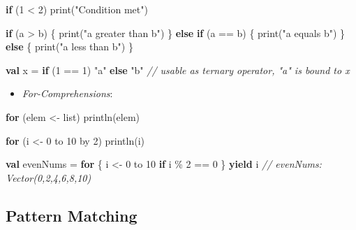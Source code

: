 \documentclass[]{article}
\newenvironment{Shaded}{}{}
\newcommand{\CommentTok}[1]{\textcolor[rgb]{0.38,0.63,0.69}{\textit{#1}}}
\newcommand{\DecValTok}[1]{\textcolor[rgb]{0.25,0.63,0.44}{#1}}
\newcommand{\FunctionTok}[1]{\textcolor[rgb]{0.02,0.16,0.49}{#1}}
\newcommand{\KeywordTok}[1]{\textcolor[rgb]{0.00,0.44,0.13}{\textbf{#1}}}
\newcommand{\NormalTok}[1]{#1}
\newcommand{\StringTok}[1]{\textcolor[rgb]{0.25,0.44,0.63}{#1}}
\providecommand{\tightlist}{%
  \setlength{\itemsep}{0pt}\setlength{\parskip}{0pt}}
\begin{document}
\begin{Shaded}
\begin{Highlighting}[]
\KeywordTok{if}\NormalTok{ (}\DecValTok{1}\NormalTok{ \textless{} }\DecValTok{2}\NormalTok{) }\FunctionTok{print}\NormalTok{(}\StringTok{"Condition met"}\NormalTok{)}

\KeywordTok{if}\NormalTok{ (a \textgreater{} b) \{}
    \FunctionTok{print}\NormalTok{(}\StringTok{"a greater than b"}\NormalTok{)}
\NormalTok{\} }\KeywordTok{else} \KeywordTok{if}\NormalTok{ (a == b) \{}
    \FunctionTok{print}\NormalTok{(}\StringTok{"a equals b"}\NormalTok{)}
\NormalTok{\} }\KeywordTok{else}\NormalTok{ \{}
    \FunctionTok{print}\NormalTok{(}\StringTok{"a less than b"}\NormalTok{)}
\NormalTok{\}}

\KeywordTok{val}\NormalTok{ x = }\KeywordTok{if}\NormalTok{ (}\DecValTok{1}\NormalTok{ == }\DecValTok{1}\NormalTok{) }\StringTok{"a"} \KeywordTok{else} \StringTok{"b"} \CommentTok{// usable as ternary operator, "a" is bound to x}
\end{Highlighting}
\end{Shaded}

\begin{itemize}
\tightlist
\item
  \emph{For-Comprehensions}:
\end{itemize}

\begin{Shaded}
\begin{Highlighting}[]
\KeywordTok{for}\NormalTok{ (elem \textless{}{-} list) }\FunctionTok{println}\NormalTok{(elem)}

\KeywordTok{for}\NormalTok{ (i \textless{}{-} }\DecValTok{0}\NormalTok{ to }\DecValTok{10}\NormalTok{ by }\DecValTok{2}\NormalTok{) }\FunctionTok{println}\NormalTok{(i)}

\KeywordTok{val}\NormalTok{ evenNums = }\KeywordTok{for}\NormalTok{ \{}
\NormalTok{  i \textless{}{-} }\DecValTok{0}\NormalTok{ to }\DecValTok{10}
  \KeywordTok{if}\NormalTok{ i \% }\DecValTok{2}\NormalTok{ == }\DecValTok{0}
\NormalTok{\} }\KeywordTok{yield}\NormalTok{ i}
\CommentTok{// evenNums: Vector(0,2,4,6,8,10)}
\end{Highlighting}
\end{Shaded}

\hypertarget{pattern-matching}{%
\subsection{Pattern Matching}\label{pattern-matching}}
\end{document}
